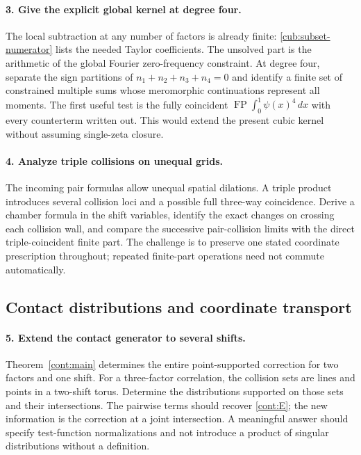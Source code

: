 \documentclass[11pt,a4paper]{article}
\theoremstyle{definition}
\theoremstyle{remark}
\DeclareMathOperator*{\FP}{FP}
\numberwithin{equation}{section}
\begin{document}
\paragraph{3. Give the explicit global kernel at degree four.}
The local subtraction at any number of factors is already finite:
\eqref{cub:subset-numerator} lists the needed Taylor coefficients.
The unsolved part is the arithmetic of the global Fourier
zero-frequency constraint. At degree four, separate the sign
partitions of $n_1+n_2+n_3+n_4=0$ and identify a finite set of
constrained multiple sums whose meromorphic continuations represent
all moments. The first useful test is the fully coincident
$\FP\int_0^1\psi(x)^4\,dx$ with every counterterm written out.
This would extend the present cubic kernel without assuming
single-zeta closure.

\paragraph{4. Analyze triple collisions on unequal grids.}
The incoming pair formulas allow unequal spatial dilations.
A triple product introduces several collision loci and a possible
full three-way coincidence. Derive a chamber formula in the shift
variables, identify the exact changes on crossing each collision
wall, and compare the successive pair-collision limits with the
direct triple-coincident finite part. The challenge is to preserve
one stated coordinate prescription throughout; repeated finite-part
operations need not commute automatically.

\subsection{Contact distributions and coordinate transport}

\paragraph{5. Extend the contact generator to several shifts.}
Theorem~\ref{cont:main} determines the entire point-supported
correction for two factors and one shift. For a three-factor
correlation, the collision sets are lines and points in a two-shift
torus. Determine the distributions supported on those sets and their
intersections. The pairwise terms should recover
\eqref{cont:E}; the new information is the correction at a joint
intersection. A meaningful answer should specify test-function
normalizations and not introduce a product of singular
distributions without a definition.
\end{document}
